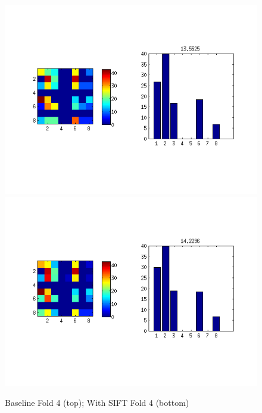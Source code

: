 \documentclass[10pt,twocolumn,letterpaper]{article}
\begin{document}
\begin{figure}[p]
 \centering
 \includegraphics[scale=0.5]{../../../evaluation/baseline/fold4_1e5.png}
 \includegraphics[scale=0.5]{../../../evaluation/feature-sift/fold4_1e5.png}
 \caption{Baseline Fold 4 (top); With SIFT Fold 4 (bottom)}
 \label{figure:withSiftFold4}
\end{figure}
\end{document}
